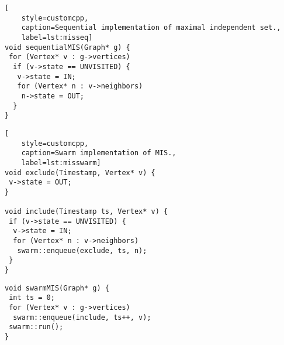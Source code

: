 
\begin{figure*}[t]
\begin{minipage}{0.30\linewidth}
\begin{lstlisting}[
    style=customcpp,
    caption=Sequential implementation of maximal independent set.,
    label=lst:misseq]
void sequentialMIS(Graph* g) {
 for (Vertex* v : g->vertices)
  if (v->state == UNVISITED) {
   v->state = IN;
   for (Vertex* n : v->neighbors)
    n->state = OUT;
  }
}
\end{lstlisting}
\end{minipage}
\hfill
\begin{minipage}{0.30\linewidth}
\begin{lstlisting}[
    style=customcpp,
    caption=Swarm implementation of MIS.,
    label=lst:misswarm]
void exclude(Timestamp, Vertex* v) {
 v->state = OUT;
}

void include(Timestamp ts, Vertex* v) {
 if (v->state == UNVISITED) {
  v->state = IN;
  for (Vertex* n : v->neighbors)
   swarm::enqueue(exclude, ts, n);
 }
}
\end{lstlisting}
\end{minipage}
\begin{minipage}{0.30\linewidth}
\begin{lstlisting}[style=customcpp]
void swarmMIS(Graph* g) {
 int ts = 0;
 for (Vertex* v : g->vertices)
  swarm::enqueue(include, ts++, v);
 swarm::run();
}
\end{lstlisting}
\end{minipage}
\end{figure*}
